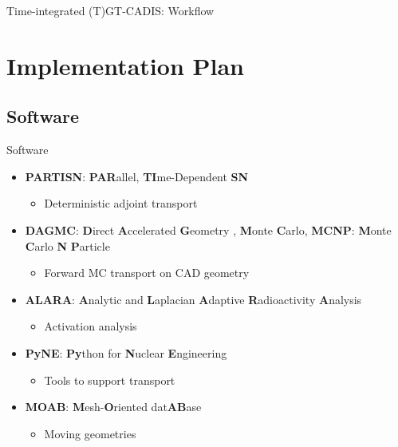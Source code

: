 \documentclass{beamer}
\begin{document}
\begin{frame}{Time-integrated (T)GT-CADIS: Workflow}
\begin{figure}
{
	}%
\end{figure}


\end{frame}


\section{Implementation Plan}

\subsection{Software}
\begin{frame}{Software}
	\begin{itemize}
		\item{\textbf{PARTISN}: \textbf{PAR}allel, \textbf{TI}me-Dependent \textbf{SN}
			 \cite{partisn}}
		   \begin{itemize}
		   \item{Deterministic adjoint transport}
		   \end{itemize}
	   \item{\textbf{DAGMC}: \textbf{D}irect \textbf{A}ccelerated
		   \textbf{G}eometry \cite{dagmc},
		   \textbf{M}onte \textbf{C}arlo, \textbf{MCNP}: \textbf{M}onte
			\textbf{C}arlo \textbf{N} \textbf{P}article
			\cite{mcnp_manual}}
		   \begin{itemize}
		   \item{Forward MC transport on CAD geometry}
		   \end{itemize}
	   \item{\textbf{ALARA}: \textbf{A}nalytic and \textbf{L}aplacian
		   \textbf{A}daptive \textbf{R}adioactivity \textbf{A}nalysis
			\cite{alara}}
			\vspace{-0.4cm}
		   \begin{itemize}
		   \item{Activation analysis}
		   \end{itemize}
	   \item{\textbf{PyNE}: \textbf{Py}thon for \textbf{N}uclear \textbf{E}ngineering
			 \cite{pyne}}
		   \begin{itemize}
		   \item{Tools to support transport}
		   \end{itemize}
	   \item{\textbf{MOAB}: \textbf{M}esh-\textbf{O}riented 
		   dat\textbf{AB}ase \cite{moab}}
		   \begin{itemize}
		   \item{Moving geometries}
		   \end{itemize}
	\end{itemize}
\end{frame}
\end{document}
